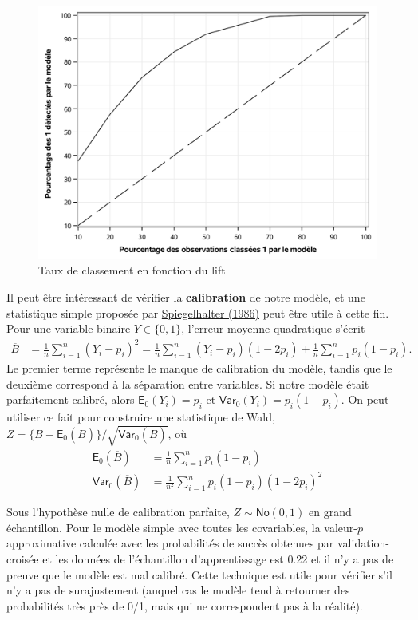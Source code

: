 \documentclass[
  11pt,
  letterpaper,
]{book}
\theoremstyle{definition}
\theoremstyle{definition}
\theoremstyle{definition}
\theoremstyle{definition}
\theoremstyle{remark}
\begin{document}
\begin{figure}

{\centering \includegraphics[width=0.8\linewidth]{figures/03-logistic-e17} 

}

\caption{Taux de classement en fonction du lift}\label{fig:fig3-e17}
\end{figure}

Il peut être intéressant de vérifier la \textbf{calibration} de notre modèle, et une statistique simple proposée par \href{https://doi.org/10.1002/sim.4780050506}{Spiegelhalter (1986)} peut être utile à cette fin. Pour une variable binaire \(Y \in \{0,1\}\), l'erreur moyenne quadratique s'écrit
\begin{align*}
\overline{B} &= \frac{1}{n} \sum_{i=1}^n (Y_i-p_i)^2 
=\frac{1}{n} \sum_{i=1}^n(Y_i-p_i)(1-2p_i) + \frac{1}{n} \sum_{i=1}^n p_i(1-p_i).
\end{align*}
Le premier terme représente le manque de calibration du modèle, tandis que le deuxième correspond à la séparation entre variables. Si notre modèle était parfaitement calibré, alors \(\mathsf{E}_0(Y_i)=p_i\) et \(\mathsf{Var}_0(Y_i) = p_i(1-p_i)\). On peut utiliser ce fait pour construire une statistique de Wald, \(Z = \{\overline{B} - \mathsf{E}_0(\overline{B})\}/\sqrt{\mathsf{Var}_0(\overline{B})}\), où
\begin{align*}
\mathsf{E}_0(\overline{B})&= \frac{1}{n} \sum_{i=1}^n p_i(1-p_i) \\
\mathsf{Var}_0(\overline{B})&= \frac{1}{n^2} \sum_{i=1}^n p_i(1-p_i)(1-2p_i)^2
\end{align*}

Sous l'hypothèse nulle de calibration parfaite, \(Z \sim \mathsf{No}(0,1)\) en grand échantillon. Pour le modèle simple avec toutes les covariables, la valeur-\(p\) approximative calculée avec les probabilités de succès obtenues par validation-croisée et les données de l'échantillon d'apprentissage est 0.22 et il n'y a pas de preuve que le modèle est mal calibré. Cette technique est utile pour vérifier s'il n'y a pas de surajustement (auquel cas le modèle tend à retourner des probabilités très près de 0/1, mais qui ne correspondent pas à la réalité).
\end{document}
